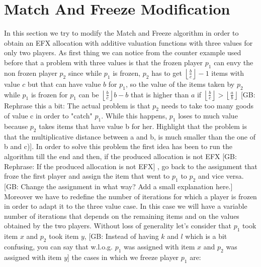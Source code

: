\documentclass{article}
\newcommand{\gb}[1]{{\color{red}[GB: #1]}}
\begin{document}
\section{Match And Freeze Modification}
In this section we try to modify the Match and Freeze algorithm in order to obtain an EFX allocation with additive valuation functions with three values for only two players. As first thing we can notice from the counter example used before that a problem with three values is that the frozen player $p_1$ can envy the non frozen player $p_2$ since while $p_1$ is frozen, $p_2$ has to get $\left \lfloor \frac{b}{c}\right \rfloor -1$ items with value $c$ but that can have value $b$ for $p_1$, so the value of the items taken by $p_2$ while $p_1$ is frozen for $p_1$ can be $\left \lfloor \frac{b}{c}\right \rfloor b - b$ that is higher than $a$ if $\left \lfloor \frac{b}{c}\right \rfloor > \left \lfloor \frac{a}{b}\right \rfloor$
\gb{Rephrase this a bit: The actual problem is that $p_2$ needs to take too many goods of value c in order to "catch" $p_1$. While this happens, $p_1$ loses to much  value because $p_2$ takes items that have value b for her. Highlight that the problem is that the multiplicative distance between a and b, is much smaller than the one of b and c)}. 
In order to solve this problem the first idea has been to run the algorithm till the end and then, if the produced allocation is not EFX
\gb{Rephrase: If the produced allocation is not EFX}
, go back to the assignment that froze the first player and assign the item that went to $p_1$ to $p_2$ and vice versa.
\gb{Change the assignment in what way? Add a small explanation here.}
Moreover we have to redefine the number of iterations for which a player is frozen in order to adapt it to the three value case. In this case we will have a variable number of iterations that depends on the remaining items and on the values obtained by the two players. Without loss of generality let's consider that $p_1$ took item $x$ and $p_2$ took item $y$,
\gb{Instead of having $k$ and $l$ which is a bit confusing, you can say that w.l.o.g. $p_1$ was assigned with item $x$ and $p_2$ was assigned with item $y$}
the cases in which we freeze player $p_1$ are: 
\end{document}
